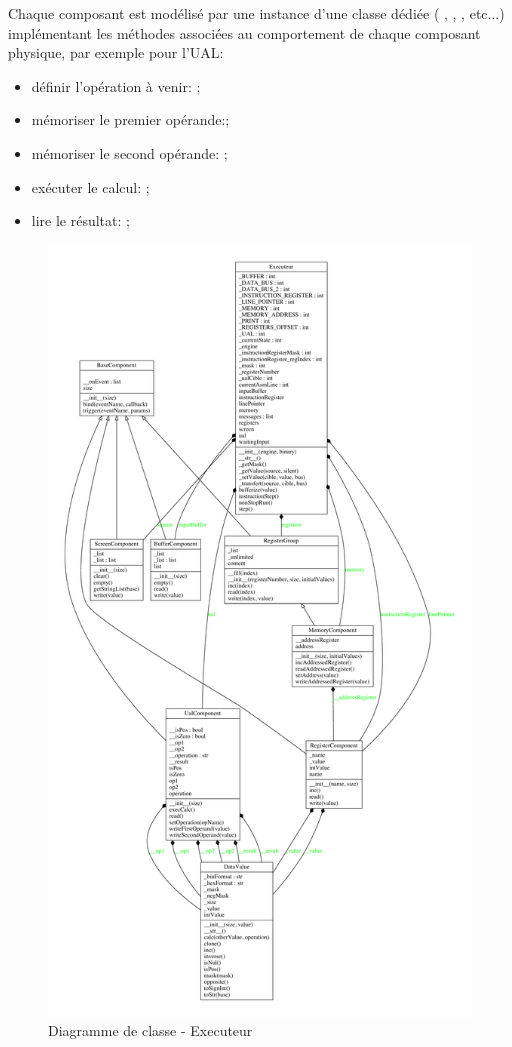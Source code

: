 Chaque composant est modélisé par une instance d'une classe dédiée ( , , , etc...) implémentant les méthodes associées au comportement de chaque composant physique, par exemple pour l'UAL:
\begin{itemize}
	\item définir l'opération à venir: ;
	\item mémoriser le premier opérande:;
	\item mémoriser le second opérande: ;
	\item exécuter le calcul: ;
	\item lire le résultat: ;
\end{itemize}


\begin{figure}[h!]
	\centering
	\includegraphics[height = 0.85\textheight]{./Pictures/Executeur.pdf}
	\caption{\label{fig:class_Executeur} Diagramme de classe - Executeur}
\end{figure} 

\clearpage